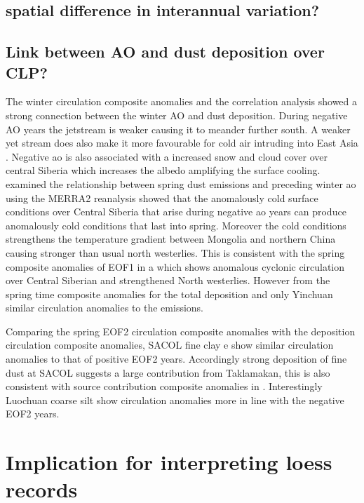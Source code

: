 \subsection{spatial difference in interannual variation?}
\subsection{Link between AO and dust deposition over CLP?}
The winter circulation composite anomalies and the correlation analysis showed a strong connection between the winter AO and dust deposition. During negative AO years the jetstream is weaker causing it to meander further south. A weaker yet stream does also make it more favourable for cold air intruding into East Asia \parencite{he2017impact}. Negative \acrshort{ao} is also associated with a increased snow and cloud cover over central Siberia which increases the albedo amplifying the surface  cooling.  \textcite{liu2018influence} examined the relationship between spring dust emissions and preceding winter \acrshort{ao} using the MERRA2 reanalysis showed that the anomalously cold surface conditions over Central Siberia that arise during negative \acrshort{ao} years can produce anomalously cold conditions that last into spring. Moreover the cold conditions strengthens the temperature gradient between Mongolia and northern China causing stronger than usual north westerlies. This is consistent with the spring composite anomalies of EOF1 in a which shows anomalous cyclonic circulation over Central Siberian and strengthened North westerlies. However from the spring time composite anomalies for the total deposition   and  only Yinchuan similar circulation anomalies to the emissions. 

Comparing the spring EOF2 circulation composite anomalies with the deposition circulation composite anomalies, SACOL fine clay e show similar circulation anomalies to that of positive EOF2 years. Accordingly strong deposition of fine dust at SACOL suggests a large contribution from Taklamakan, this is also consistent with source contribution composite anomalies in . Interestingly Luochuan coarse silt show circulation anomalies more in line with the negative EOF2 years.    

\section{Implication for interpreting loess records}